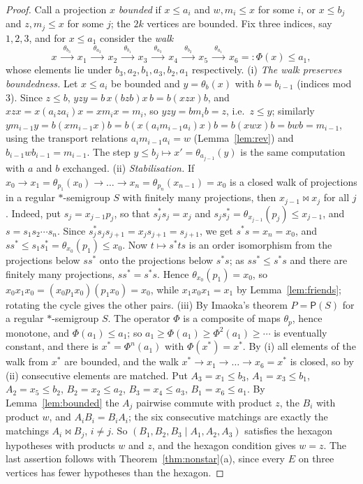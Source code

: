 \documentclass[11pt]{amsart}
\theoremstyle{definition}
\newcommand{\PA}{\mathsf{P}}         %
\newcommand{\mt}{\bowtie}      %
\begin{document}
\begin{proof}
Call a projection $x$ \emph{bounded} if $x\le a_i$ and $w,m_i\le x$ for some $i$, or $x\le b_j$ and $z,m_j\le x$ for some $j$; the $2k$ vertices are bounded. Fix three indices, say $1,2,3$, and for $x\le a_1$ consider the \emph{walk}
\[
x\ \xrightarrow{\ \theta_{b_3}\ }\ x_1\ \xrightarrow{\ \theta_{a_2}\ }\ x_2\ \xrightarrow{\ \theta_{b_1}\ }\ x_3\ \xrightarrow{\ \theta_{a_3}\ }\ x_4\ \xrightarrow{\ \theta_{b_2}\ }\ x_5\ \xrightarrow{\ \theta_{a_1}\ }\ x_6=:\Phi(x)\le a_1 ,
\]
whose elements lie under $b_3,a_2,b_1,a_3,b_2,a_1$ respectively. (i) \emph{The walk preserves boundedness.} Let $x\le a_i$ be bounded and $y=\theta_b(x)$ with $b=b_{i-1}$ (indices mod~$3$). Since $z\le b$, $yzy=b\,x(bzb)x\,b=b(xzx)b$, and $xzx=x(a_iza_i)x=xm_ix=m_i$, so $yzy=bm_ib=z$, i.e.\ $z\le y$; similarly $ym_{i-1}y=b(xm_{i-1}x)b=b(x(a_im_{i-1}a_i)x)b=b(xwx)b=bwb=m_{i-1}$, using the transport relations $a_im_{i-1}a_i=w$ (Lemma~\ref{lem:rev}) and $b_{i-1}wb_{i-1}=m_{i-1}$. The step $y\le b_j\mapsto x'=\theta_{a_{j-1}}(y)$ is the same computation with $a$ and $b$ exchanged. (ii) \emph{Stabilisation.} If $x_0\to x_1=\theta_{p_1}(x_0)\to\dots\to x_n=\theta_{p_n}(x_{n-1})=x_0$ is a closed walk of projections in a regular $*$-semigroup $S$ with finitely many projections, then $x_{j-1}\mt x_j$ for all $j$. Indeed, put $s_j=x_{j-1}p_j$, so that $s_j^*s_j=x_j$ and $s_js_j^*=\theta_{x_{j-1}}(p_j)\le x_{j-1}$, and $s=s_1s_2\cdots s_n$. Since $s_j^*s_js_{j+1}=x_js_{j+1}=s_{j+1}$, we get $s^*s=x_n=x_0$, and $ss^*\le s_1s_1^*=\theta_{x_0}(p_1)\le x_0$. Now $t\mapsto s^*ts$ is an order isomorphism from the projections below $ss^*$ onto the projections below $s^*s$; as $ss^*\le s^*s$ and there are finitely many projections, $ss^*=s^*s$. Hence $\theta_{x_0}(p_1)=x_0$, so $x_0x_1x_0=(x_0p_1x_0)(p_1x_0)=x_0$, while $x_1x_0x_1=x_1$ by Lemma~\ref{lem:friends}; rotating the cycle gives the other pairs. (iii) By Imaoka's theorem $P=\PA(S)$ for a regular $*$-semigroup $S$. The operator $\Phi$ is a composite of maps $\theta_p$, hence monotone, and $\Phi(a_1)\le a_1$; so $a_1\ge\Phi(a_1)\ge\Phi^2(a_1)\ge\cdots$ is eventually constant, and there is $x^*=\Phi^n(a_1)$ with $\Phi(x^*)=x^*$. By (i) all elements of the walk from $x^*$ are bounded, and the walk $x^*\to x_1\to\dots\to x_6=x^*$ is closed, so by (ii) consecutive elements are matched. Put $A_3=x_1\le b_3$, $A_1=x_3\le b_1$, $A_2=x_5\le b_2$, $B_2=x_2\le a_2$, $B_3=x_4\le a_3$, $B_1=x_6\le a_1$. By Lemma~\ref{lem:bounded} the $A_j$ pairwise commute with product $z$, the $B_i$ with product $w$, and $A_iB_i=B_iA_i$; the six consecutive matchings are exactly the matchings $A_i\mt B_j$, $i\ne j$. So $(B_1,B_2,B_3\mid A_1,A_2,A_3)$ satisfies the hexagon hypotheses with products $w$ and $z$, and the hexagon condition gives $w=z$. The last assertion follows with Theorem~\ref{thm:nonstar}(a), since every $E$ on three vertices has fewer hypotheses than the hexagon.
\end{proof}
\end{document}
